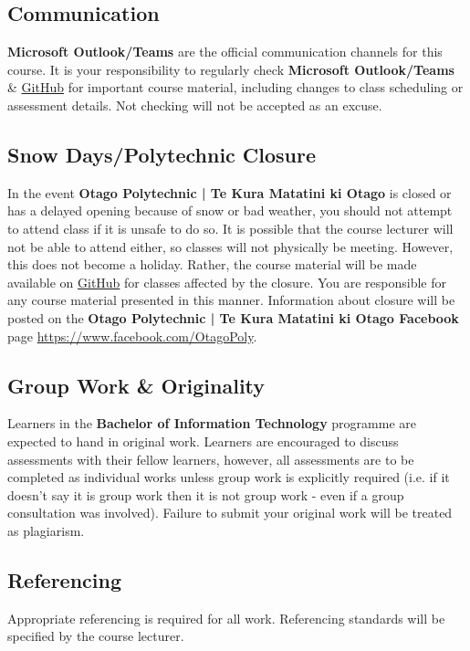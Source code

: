 \documentclass{article}
\begin{document}
\subsection*{Communication}
\textbf{Microsoft Outlook/Teams} are the official communication channels for this course. It is your responsibility to regularly check \textbf{Microsoft Outlook/Teams} \& \href{https://github.com/otago-polytechnic-bit-courses/ID630151-introduction-to-algorithmic-problem-solving}{GitHub} for important course material, including changes to class scheduling or assessment details. Not checking will not be accepted as an excuse.

\subsection*{Snow Days/Polytechnic Closure}
In the event \textbf{Otago Polytechnic | Te Kura Matatini ki Otago} is closed or has a delayed opening because of snow or bad weather, you should not attempt to attend class if it is unsafe to do so. It is possible that the course lecturer will not be able to attend either, so classes will not physically be meeting. However, this does not become a holiday. Rather, the course material will be made available on \href{https://github.com/otago-polytechnic-bit-courses/ID630151-introduction-to-algorithmic-problem-solving}{GitHub} for classes affected by the closure. You are responsible for any course material presented in this manner. Information about closure will be posted on the \textbf{Otago Polytechnic | Te Kura Matatini ki Otago Facebook} page \href{https://www.facebook.com/OtagoPoly}{https://www.facebook.com/OtagoPoly}.

\subsection*{Group Work \& Originality}
Learners in the \textbf{Bachelor of Information Technology} programme are expected to hand in original work. Learners are encouraged to discuss assessments with their fellow learners, however, all assessments are to be completed as individual works unless group work is explicitly required (i.e. if it doesn't say it is group work then it is not group work - even if a group consultation was involved). Failure to submit your original work will be treated as plagiarism.

\subsection*{Referencing}
Appropriate referencing is required for all work. Referencing standards will be specified by the course lecturer.
\end{document}
